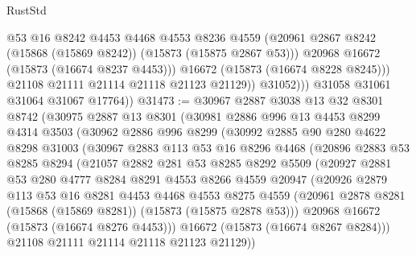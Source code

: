 \begin{lexlean}{RustStd}
\begin{coremodule}
                      @53
                      @16
                      @8242
                      @4453
                      @4468
                      @4553
                      @8236
                      @4559
                      (@20961 @2867 @8242 (@15868 (@15869 @8242)) (@15873 (@15875 @2867 @53)))
                      @20968
                      @16672
                      (@15873 (@16674 @8237 @4453)))
                    @16672
                    (@15873 (@16674 @8228 @8245)))
                  @21108
                  @21111
                  @21114
                  @21118
                  @21123
                  @21129))
              @31052)))
        @31058
        @31061
        @31064
        @31067
        @17764))
@31473 := @30967
    @2887
    @3038
    @13
    @32
    @8301
    @8742
    (@30975
      @2887
      @13
      @8301
      (@30981
        @2886
        @996
        @13
        @4453
        @8299
        @4314
        @3503
        (@30962
          @2886
          @996
          @8299
          (@30992
            @2885
            @90
            @280
            @4622
            @8298
            @31003
            (@30967
              @2883
              @113
              @53
              @16
              @8296
              @4468
              (@20896
                @2883
                @53
                @8285
                @8294
                (@21057
                  @2882
                  @281
                  @53
                  @8285
                  @8292
                  @5509
                  (@20927
                    @2881
                    @53
                    @280
                    @4777
                    @8284
                    @8291
                    @4553
                    @8266
                    @4559
                    @20947
                    (@20926
                      @2879
                      @113
                      @53
                      @16
                      @8281
                      @4453
                      @4468
                      @4553
                      @8275
                      @4559
                      (@20961 @2878 @8281 (@15868 (@15869 @8281)) (@15873 (@15875 @2878 @53)))
                      @20968
                      @16672
                      (@15873 (@16674 @8276 @4453)))
                    @16672
                    (@15873 (@16674 @8267 @8284)))
                  @21108
                  @21111
                  @21114
                  @21118
                  @21123
                  @21129))

\end{coremodule}
\end{lexlean}
